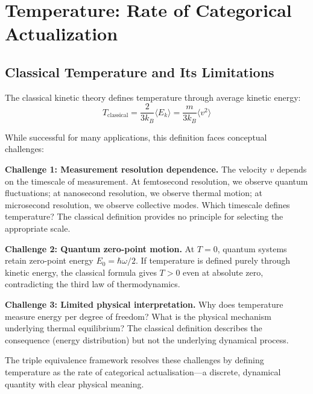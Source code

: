 \section{Temperature: Rate of Categorical Actualization}
\label{sec:temperature}

\subsection{Classical Temperature and Its Limitations}

The classical kinetic theory defines temperature through average kinetic energy:
\begin{equation}
T_{\text{classical}} = \frac{2}{3k_B}\langle E_k \rangle = \frac{m}{3k_B}\langle v^2 \rangle
\end{equation}

While successful for many applications, this definition faces conceptual challenges:

\textbf{Challenge 1: Measurement resolution dependence.} The velocity $v$ depends on the timescale of measurement. At femtosecond resolution, we observe quantum fluctuations; at nanosecond resolution, we observe thermal motion; at microsecond resolution, we observe collective modes. Which timescale defines temperature? The classical definition provides no principle for selecting the appropriate scale.

\textbf{Challenge 2: Quantum zero-point motion.} At $T = 0$, quantum systems retain zero-point energy $E_0 = \hbar\omega/2$. If temperature is defined purely through kinetic energy, the classical formula gives $T > 0$ even at absolute zero, contradicting the third law of thermodynamics.

\textbf{Challenge 3: Limited physical interpretation.} Why does temperature measure energy per degree of freedom? What is the physical mechanism underlying thermal equilibrium? The classical definition describes the consequence (energy distribution) but not the underlying dynamical process.

The triple equivalence framework resolves these challenges by defining temperature as the rate of categorical actualisation—a discrete, dynamical quantity with clear physical meaning.

